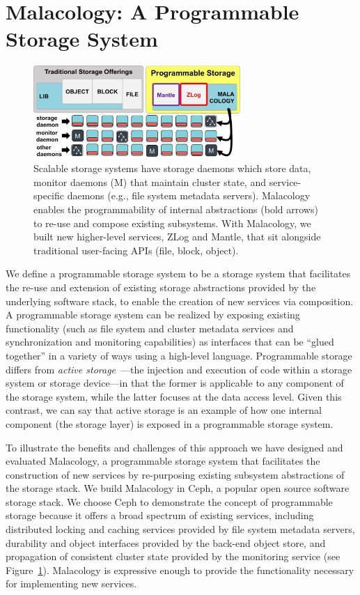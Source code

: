\section{Malacology: A Programmable Storage System}

\begin{figure}[tb]
\centering
\includegraphics[width=0.7\textwidth]{./chapters/background/figures/overview.png}
\caption{Scalable storage systems have storage daemons which store data,
monitor daemons (M) that maintain cluster state, and service-specific daemons
(e.g., file system metadata servers). Malacology enables the programmability of
internal abstractions (bold arrows) to re-use and compose existing subsystems.
With Malacology, we built new higher-level services, ZLog and Mantle, that sit
alongside traditional user-facing APIs (file, block,
object).}\label{fig:overview}
\end{figure}

We define a programmable storage system to be a storage system that facilitates
the re-use and extension of existing storage abstractions provided by the
underlying software stack, to enable the creation of new services via
composition.  A programmable storage system can be realized by exposing
existing functionality (such as file system and cluster
metadata services and synchronization and monitoring capabilities) as
interfaces that can be ``glued together'' in a variety of ways using a
high-level language. Programmable storage differs from \emph{active
storage}~\cite{riedel:vldb98}---the injection and execution of code within a
storage system or storage device---in that the former is applicable to any
component of the storage system, while the latter focuses at the data access
level. Given this contrast, we can say that active storage is an example of how
one internal component (the storage layer) is exposed in a programmable storage
system.

To illustrate the benefits and challenges of this approach we have designed and
evaluated Malacology, a programmable storage system that facilitates the
construction of new services by re-purposing existing subsystem abstractions of
the storage stack.  We build Malacology in Ceph, a popular open source software
storage stack.  We choose Ceph to demonstrate the concept of programmable
storage because it offers a broad spectrum of existing services, including
distributed locking and caching services provided by file
system metadata servers, durability and object interfaces provided by the
back-end object store, and propagation of consistent cluster state provided by
the monitoring service (see Figure~\ref{fig:overview}).  Malacology is
expressive enough to provide the functionality necessary for implementing new
services.

